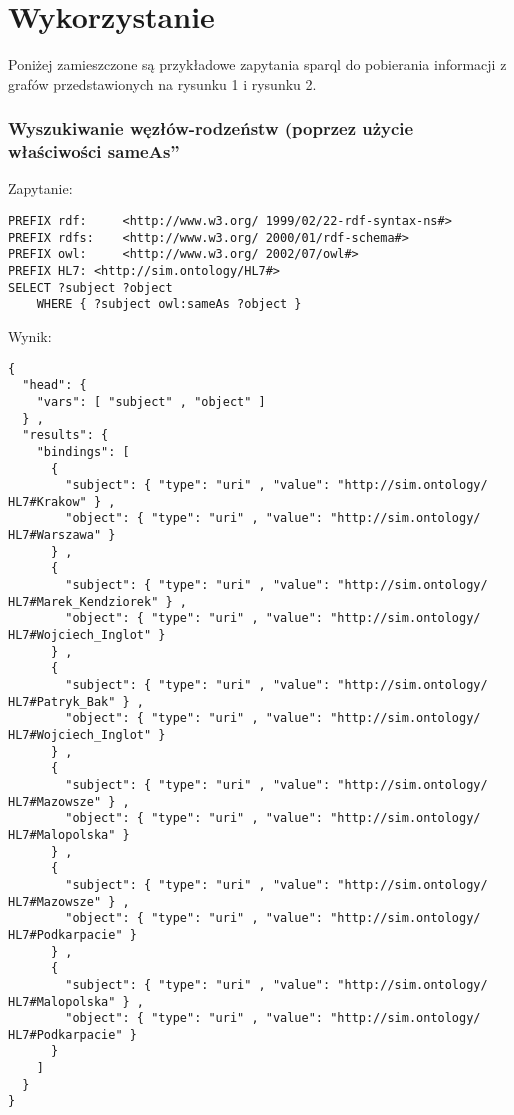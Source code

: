 \section{Wykorzystanie}
\label{cha:impl}

Poniżej zamieszczone są przykładowe zapytania sparql do pobierania informacji z grafów przedstawionych na rysunku 1 i rysunku 2.

\subsubsection{Wyszukiwanie węzłów-rodzeństw (poprzez użycie \quotedblbase właściwości sameAs\textquotedblright }

Zapytanie:
\begin{lstlisting}
PREFIX rdf:     <http://www.w3.org/ 1999/02/22-rdf-syntax-ns#> 
PREFIX rdfs:    <http://www.w3.org/ 2000/01/rdf-schema#>
PREFIX owl:     <http://www.w3.org/ 2002/07/owl#>
PREFIX HL7: <http://sim.ontology/HL7#>
SELECT ?subject ?object
	WHERE { ?subject owl:sameAs ?object }
\end{lstlisting}

Wynik:
\begin{lstlisting}
{
  "head": {
    "vars": [ "subject" , "object" ]
  } ,
  "results": {
    "bindings": [
      {
        "subject": { "type": "uri" , "value": "http://sim.ontology/ HL7#Krakow" } ,
        "object": { "type": "uri" , "value": "http://sim.ontology/ HL7#Warszawa" }
      } ,
      {
        "subject": { "type": "uri" , "value": "http://sim.ontology/ HL7#Marek_Kendziorek" } ,
        "object": { "type": "uri" , "value": "http://sim.ontology/ HL7#Wojciech_Inglot" }
      } ,
      {
        "subject": { "type": "uri" , "value": "http://sim.ontology/ HL7#Patryk_Bak" } ,
        "object": { "type": "uri" , "value": "http://sim.ontology/ HL7#Wojciech_Inglot" }
      } ,
      {
        "subject": { "type": "uri" , "value": "http://sim.ontology/ HL7#Mazowsze" } ,
        "object": { "type": "uri" , "value": "http://sim.ontology/ HL7#Malopolska" }
      } ,
      {
        "subject": { "type": "uri" , "value": "http://sim.ontology/ HL7#Mazowsze" } ,
        "object": { "type": "uri" , "value": "http://sim.ontology/ HL7#Podkarpacie" }
      } ,
      {
        "subject": { "type": "uri" , "value": "http://sim.ontology/ HL7#Malopolska" } ,
        "object": { "type": "uri" , "value": "http://sim.ontology/ HL7#Podkarpacie" }
      }
    ]
  }
}

\end{lstlisting}


